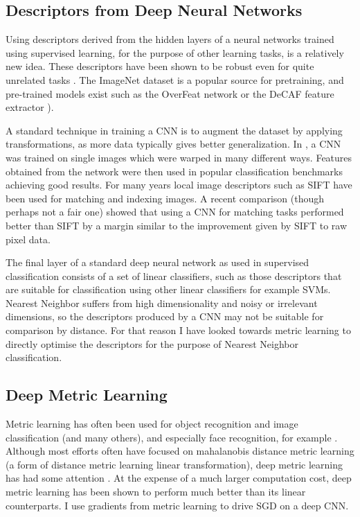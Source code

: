 \subsection {Descriptors from Deep Neural Networks}

Using descriptors derived from the hidden layers of a neural networks trained using supervised learning, for the purpose of other learning tasks, is a relatively new idea. These descriptors have been shown to be robust even for quite unrelated tasks \cite{Donahue2014,Razavian2014}. The ImageNet dataset \cite{Krizhevsky2012} is a popular source for pretraining, and pre-trained models exist such as the OverFeat network \cite{Sermanet2013} or the DeCAF feature extractor \cite{Donahue2014}). 

A standard technique in training a \gls{CNN} is to augment the dataset by applying transformations, as more data typically gives better generalization. In \cite{Dosovitskiy2013}, a \gls{CNN} was trained on single images which were warped in many different ways. Features obtained from the network were then used in popular classification benchmarks achieving good results. For many years local image descriptors such as \gls{SIFT} \cite{Lowe2004} have been used for matching and indexing images.  A recent comparison \cite{Fischer2014} (though perhaps not a fair one) showed that using a \gls{CNN} for matching tasks performed better than \gls{SIFT} by a margin similar to the improvement given by \gls{SIFT} to raw pixel data.


The final layer of a standard deep neural network as used in supervised classification consists of a set of linear classifiers, such as  those descriptors that are suitable for classification using other linear classifiers for example \gls{SVM}s. Nearest Neighbor suffers from high dimensionality and noisy or irrelevant dimensions, so the descriptors produced by a CNN may not be suitable for comparison by distance. For that reason I have looked towards metric learning to directly optimise the descriptors for the purpose of Nearest Neighbor classification. 


\subsection {Deep Metric Learning}


Metric learning has often been used for object recognition and image classification \cite{Hadsell2006,Min2009} (and many others), and especially face recognition, for example \cite{Kostinger2012}. Although most efforts often have focused on mahalanobis distance metric learning (a form of distance metric learning linear transformation), deep metric learning has had some attention \cite {Salakhutdinov2007a,Min2009,Weston2009,Min2010}. At the expense of a much larger computation cost, deep metric learning has been shown to perform much better than its linear counterparts. I use gradients from metric learning to drive \gls{SGD} on a deep \gls{CNN}. 

